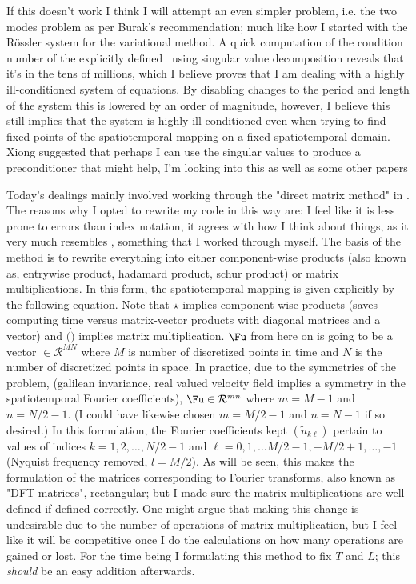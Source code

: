 If this doesn't work I think I will attempt an even simpler problem, i.e.
the two modes problem as per Burak's recommendation; much like how I started
with the R\"ossler system for the variational method.
A quick computation of the condition number of the explicitly defined \jacobianM\ using
singular value decomposition reveals that it's in the tens of millions, which I believe
proves that I am dealing with a highly ill-conditioned system of equations.
By disabling changes to the period and length of the system this is lowered by an
order of magnitude, however, I believe this still implies that the system is highly ill-conditioned
even when trying to find fixed points of the spatiotemporal mapping on a fixed spatiotemporal domain.
Xiong suggested that perhaps I can use the singular values to produce a preconditioner that might help,
I'm looking into this as well as some other papers

Today's dealings mainly involved working through the "direct matrix method" in .
The reasons why I opted to rewrite my code in this way are: I feel like it is less
prone to errors than index notation, it agrees with how I think about things, as it
very much resembles , something that I worked through myself.
The basis of the method is to rewrite everything into either component-wise products
(also known as, entrywise product, hadamard product,
schur product)  or matrix multiplications. In this form, the spatiotemporal mapping is given explicitly
by the following equation. Note that $\star$ implies component wise products (saves computing time versus
matrix-vector products with diagonal matrices and a vector) and $(\dot)$ implies matrix multiplication. $\Fu$
from here on is going to be a vector $\in \mathcal{R}^{MN}$ where $M$ is number of discretized points in time and $N$ is
the number of discretized points in space. In practice, due to the symmetries of the problem, (galilean invariance, real valued
velocity field implies a symmetry in the spatiotemporal Fourier coefficients), $\Fu \in \mathcal{R}^{mn}$ where
$m = M-1$ and $n = N/2 - 1 $. (I could have likewise chosen $m = M/2 -1$ and $n = N-1$ if so desired.) In this formulation,
the Fourier coefficients kept $(\tilde{u}_{k \ell})$ pertain to values of indices $k = 1, 2, \ldots, N/2-1$ and $\ell = 0,1, ...
M/2-1, -M/2+1, \ldots, -1$ (Nyquist frequency removed, $l = M/2$).
As will be seen, this makes the formulation of the matrices corresponding to Fourier transforms, also known as "DFT matrices",
rectangular; but I made sure the matrix multiplications are well defined if defined correctly. One might argue that making
this change is undesirable due to the number of operations of matrix multiplication, but I feel like it will be competitive
once I do the calculations on how many operations are gained or lost.
For the time being I formulating this method to fix $T$ and $L$; this \emph{should} be
an easy addition afterwards.

